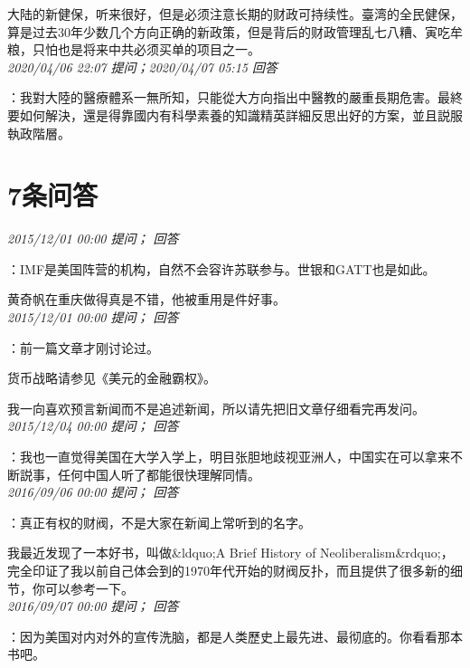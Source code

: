 \documentclass[twocolumn]{ctexart}
\begin{document}
大陆的新健保，听来很好，但是必须注意长期的财政可持续性。臺湾的全民健保，算是过去30年少数几个方向正确的新政策，但是背后的财政管理乱七八糟、寅吃牟粮，只怕也是将来中共必须买单的项目之一。\\

\textit{\hfill\noindent\small 2020/04/06 22:07 提问；2020/04/07 05:15 回答}

：我對大陸的醫療體系一無所知，只能從大方向指出中醫教的嚴重長期危害。最終要如何解決，還是得靠國内有科學素養的知識精英詳細反思出好的方案，並且説服執政階層。
\\

\section{7条问答}

\textit{\hfill\noindent\small 2015/12/01 00:00 提问； 回答}

：IMF是美国阵营的机构，自然不会容许苏联参与。世银和GATT也是如此。

黄奇帆在重庆做得真是不错，他被重用是件好事。\\

\textit{\hfill\noindent\small 2015/12/01 00:00 提问； 回答}

：前一篇文章才刚讨论过。

货币战略请参见《美元的金融霸权》。

我一向喜欢预言新闻而不是追述新闻，所以请先把旧文章仔细看完再发问。\\

\textit{\hfill\noindent\small 2015/12/04 00:00 提问； 回答}

：我也一直觉得美国在大学入学上，明目张胆地歧视亚洲人，中国实在可以拿来不断説事，任何中国人听了都能很快理解同情。\\

\textit{\hfill\noindent\small 2016/09/06 00:00 提问； 回答}

：真正有权的财阀，不是大家在新闻上常听到的名字。

我最近发现了一本好书，叫做\&ldquo;A Brief History of Neoliberalism\&rdquo;，完全印证了我以前自己体会到的1970年代开始的财阀反扑，而且提供了很多新的细节，你可以参考一下。\\

\textit{\hfill\noindent\small 2016/09/07 00:00 提问； 回答}

：因为美国对内对外的宣传洗脑，都是人类歷史上最先进、最彻底的。你看看那本书吧。\\
\end{document}
